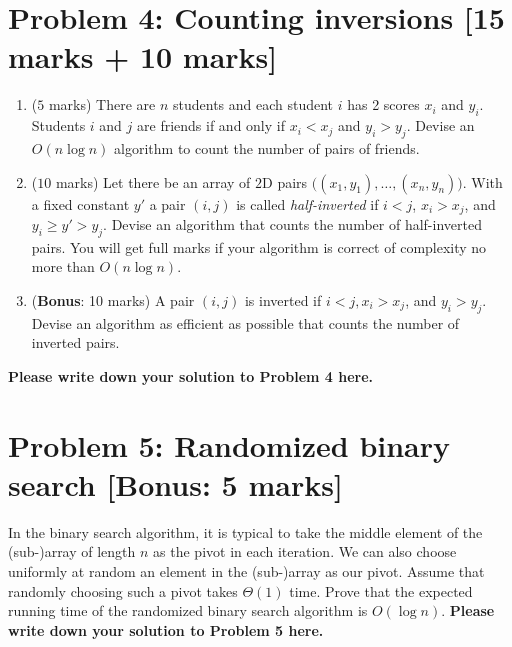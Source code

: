 \documentclass[11pt,twoside]{article}
\newcommand{\problem}[1]{\section*{Problem #1}}
\newenvironment{solution}{{\par\noindent\it Solution.}}{}
\begin{document}
\problem{4: Counting inversions [15 marks + 10 marks]} 
\begin{enumerate}
    \item ($5$ marks) There are $n$ students and each student $i$ has 2 scores $x_i$ and $y_i$. Students $i$ and $j$ are friends if and only if $x_i<x_j$ and $y_i>y_j$. Devise an $O(n\log n)$ algorithm to count the number of pairs of friends.
    \item ($10$ marks) Let there be an array of $2$D pairs $\big((x_1,y_1),\dots,(x_n,y_n) \big)$. With a fixed constant $y'$ a pair $(i,j)$ is called \textit{half-inverted} if $i<j$, $x_i>x_j$, and $y_i\geq y'>y_j$. Devise an algorithm that counts the number of half-inverted pairs. You will get full marks if your algorithm is correct of complexity no more than $O(n\log n)$.
    \item (\textbf{Bonus}: 10 marks) A pair $(i,j)$ is inverted if $i<j, x_i>x_j$, and $y_i>y_j$. Devise an algorithm as efficient as possible that counts the number of inverted pairs.
\end{enumerate}
\begin{solution}
\textbf{Please write down your solution to Problem 4 here.}
\end{solution}


\problem{5: Randomized binary search [Bonus: 5 marks]}
In the binary search algorithm, it is typical to take the middle element of the (sub-)array of length $n$ as the pivot in each iteration. We can also choose uniformly at random an element in the (sub-)array as our pivot. Assume that randomly choosing such a pivot takes $\Theta(1)$ time. Prove that the expected running time of the randomized binary search algorithm is $O(\log n)$.
\begin{solution}
\textbf{Please write down your solution to Problem 5 here.}
\end{solution}
\end{document}
